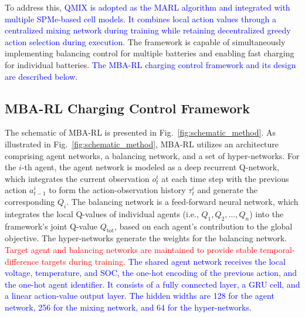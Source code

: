 \documentclass[journal]{IEEEtran}
\newcommand{\rev}[1]{\textcolor{blue}{#1}}
\newcommand{\newrev}[1]{\textcolor{red}{#1}}
\begin{document}
To address this, \rev{QMIX is adopted as the MARL algorithm \cite{26} and integrated with multiple SPMe-based cell models. It combines local action values through a centralized mixing network during training while retaining decentralized greedy action selection during execution.} The framework is capable of simultaneously implementing balancing control for multiple batteries and enabling fast charging for individual batteries. \rev{The MBA-RL charging control framework and its design are described below.}


\subsection{MBA-RL Charging Control Framework}
The schematic of MBA-RL is presented in Fig.~\ref{fig:schematic_method}. As illustrated in Fig.~\ref{fig:schematic_method}, MBA-RL utilizes an architecture comprising agent networks, a balancing network, and a set of hyper-networks. For the $i$-th agent, the agent network is modeled as a deep recurrent Q-network, which integrates the current observation $o_t^i$ at each time step with the previous action $a_{t-1}^i$ to form the action-observation history $\tau_t^i$ and generate the corresponding $Q_i$. The balancing network is a feed-forward neural network, which integrates the local Q-values of individual agents (i.e., $Q_1, Q_2, \dots, Q_n$) into the framework's joint Q-value $Q_{\text{tot}}$, based on each agent’s contribution to the global objective. The hyper-networks generate the weights for the balancing network. \newrev{Target agent and balancing networks are maintained to provide stable temporal-difference targets during training.} \rev{The shared agent network receives the local voltage, temperature, and SOC, the one-hot encoding of the previous action, and the one-hot agent identifier. It consists of a fully connected layer, a GRU cell, and a linear action-value output layer. The hidden widths are 128 for the agent network, 256 for the mixing network, and 64 for the hyper-networks.}


\end{document}
